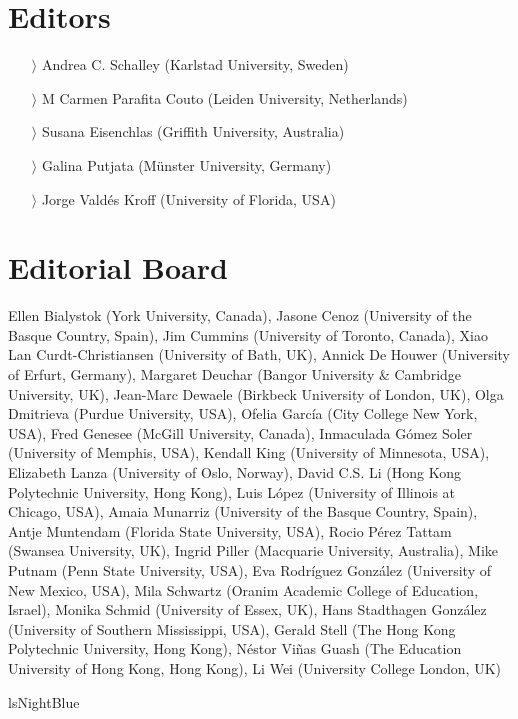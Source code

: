 \documentclass[
notumble,
nofoldmark,
]{leaflet}
\begin{document}
 \color{lsNightBlue}\footnotesize 
{}
{
\section{Editors}    
            
            
\begin{itemize}
    \item[$\rangle$] Andrea C. Schalley (Karlstad University, Sweden) 
    \item[$\rangle$] M Carmen Parafita Couto   (Leiden University, Netherlands) 
    \item[$\rangle$]Susana Eisenchlas (Griffith University, Australia)
    \item[$\rangle$]Galina Putjata (Münster University, Germany)
    \item[$\rangle$]Jorge Valdés Kroff (University of Florida, USA)
\end{itemize}
    \section{Editorial Board}    
\raggedright         
    Ellen Bialystok (York University, Canada),
    Jasone Cenoz (University of the Basque Country, Spain),
    Jim Cummins (University of Toronto, Canada),
    Xiao Lan Curdt-Christiansen (University of Bath, UK),
    Annick De Houwer (University of Erfurt, Germany),
    Margaret Deuchar (Bangor University \& Cambridge University, UK),
    Jean-Marc Dewaele (Birkbeck University of London, UK),
    Olga Dmitrieva (Purdue University, USA),
    Ofelia García (City College New York, USA),
    Fred Genesee (McGill University, Canada),
    Inmaculada Gómez Soler (University of Memphis, USA),
    Kendall King (University of Minnesota, USA),
    Elizabeth Lanza (University of Oslo, Norway),
    David C.S. Li (Hong Kong Polytechnic University, Hong Kong),
    Luis López (University of Illinois at Chicago, USA),
    Amaia Munarriz (University of the Basque Country, Spain),
    Antje Muntendam (Florida State University, USA),
    Rocio Pérez Tattam (Swansea University, UK),
    Ingrid Piller (Macquarie University, Australia),
    Mike Putnam (Penn State University, USA),
    Eva Rodríguez González (University of New Mexico, USA),
    Mila Schwartz (Oranim Academic College of Education, Israel),
    Monika Schmid (University of Essex, UK),
    Hans Stadthagen González (University of Southern Mississippi, USA),
    Gerald Stell (The Hong Kong Polytechnic University, Hong Kong),
    Néstor Viñas Guash (The Education University of Hong Kong, Hong Kong),
    Li Wei (University College London, UK)
}{lsNightBlue}
\end{document}
